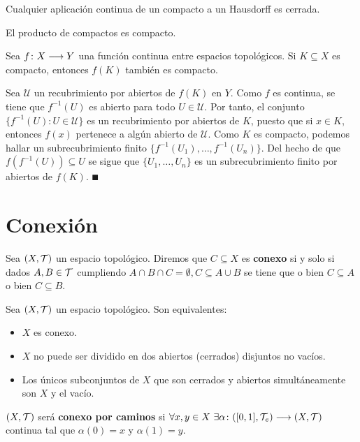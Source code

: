 \documentclass[GTS.tex]{subfiles}
\begin{document}
\begin{prop}\label{125}
Cualquier aplicación continua de un compacto a un Hausdorff es cerrada.
\end{prop}

\begin{teorema}[Tychonoff]
El producto de compactos es compacto.
\end{teorema}

\begin{teorema}
Sea $f\colon{X}\longrightarrow{Y}$ una función continua entre espacios topológicos. Si $K\subseteq X$ es compacto, entonces $f(K)$ también es compacto.
\end{teorema}

\begin{dem}
Sea $\mathcal{U}$ un recubrimiento por abiertos de $f(K)$ en $Y$. Como $f$ es continua, se tiene que $f^{-1}(U)$ es abierto para todo $U\in\mathcal{U}$. Por tanto, el conjunto $\{f^{-1}(U):U\in\mathcal{U}\}$ es un recubrimiento por abiertos de $K$, puesto que si $x\in K$, entonces $f(x)$ pertenece a algún abierto de $\mathcal{U}$. Como $K$ es compacto, podemos hallar un subrecubrimiento finito $\{f^{-1}(U_1),\dots, f^{-1}(U_n)\}$. Del hecho de que $f(f^{-1}(U))\subseteq U$ se sigue que $\{U_1,\dots, U_n\}$ es un subrecubrimiento finito por abiertos de $f(K)$. $\QED$
\end{dem}

\section{Conexión}
\begin{defi} Sea $(X,\mathcal{T})$ un espacio topológico. Diremos que $C\subseteq X$ es \textbf{conexo} si y solo si dados $A,B\in\mathcal{T}$ cumpliendo $A\cap B\cap C=\emptyset, C\subseteq A\cup B$ se tiene que o bien $C\subseteq A$ o bien $C\subseteq B$.
\end{defi}
\begin{prop}
Sea $(X,\mathcal{T})$ un espacio topológico. Son equivalentes:
\begin{itemize}
\item $X$ es conexo.
\item $X$ no puede ser dividido en dos abiertos (cerrados) disjuntos no vacíos.
\item Los únicos subconjuntos de $X$ que son cerrados y abiertos simultáneamente son $X$ y el vacío.
\end{itemize}
\end{prop}
\begin{defi} $(X,\mathcal{T})$ será \textbf{conexo por caminos} si $\forall x,y\in X\ \exists\alpha\func{([0,1],\Tau_e)}{(X,\Tau)}$ continua tal que $\alpha(0)=x$ y $\alpha(1)=y$.
\end{defi}
\end{document}
